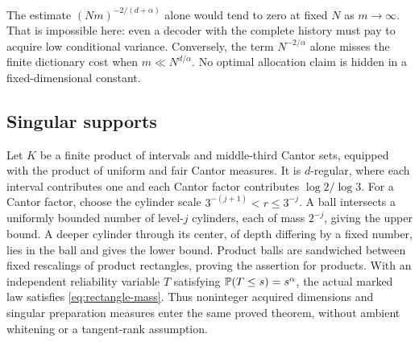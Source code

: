 \begin{remark}\label{rem:two-terms}
The estimate $(Nm)^{-2/(d+\alpha)}$ alone would tend to zero at fixed $N$ as $m\to\infty$. That is impossible here: even a decoder with the complete history must pay to acquire low conditional variance. Conversely, the term $N^{-2/\alpha}$ alone misses the finite dictionary cost when $m\ll N^{d/\alpha}$. No optimal allocation claim is hidden in a fixed-dimensional constant.
\end{remark}

\subsection*{Singular supports}
Let $K$ be a finite product of intervals and middle-third Cantor sets, equipped with the product of uniform and fair Cantor measures. It is $d$-regular, where each interval contributes one and each Cantor factor contributes $\log2/\log3$. For a Cantor factor, choose the cylinder scale $3^{-(j+1)}<r\le3^{-j}$. A ball intersects a uniformly bounded number of level-$j$ cylinders, each of mass $2^{-j}$, giving the upper bound. A deeper cylinder through its center, of depth differing by a fixed number, lies in the ball and gives the lower bound. Product balls are sandwiched between fixed rescalings of product rectangles, proving the assertion for products. With an independent reliability variable $T$ satisfying $\mathbb P(T\le s)=s^\alpha$, the actual marked law satisfies \eqref{eq:rectangle-mass}. Thus noninteger acquired dimensions and singular preparation measures enter the same proved theorem, without ambient whitening or a tangent-rank assumption.
